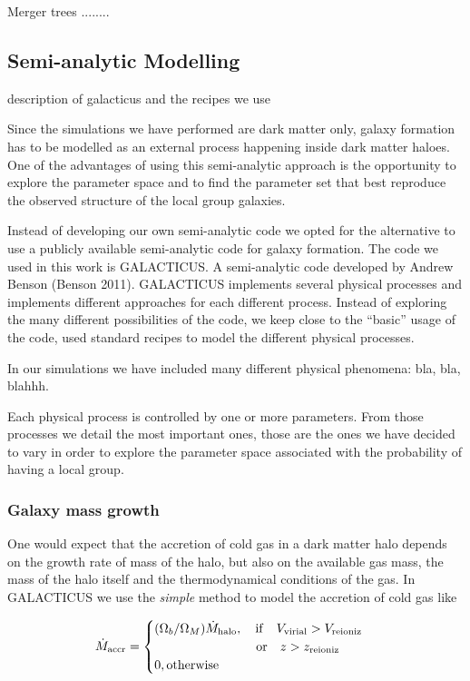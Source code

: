 \documentclass[useAMS,usenatbib]{mn2e}
\begin{document}
Merger trees ........

\subsection{Semi-analytic Modelling} 
\label{sec:sam}

description of galacticus and the recipes we use

Since the simulations we have performed are dark matter only, galaxy
formation has to be modelled as an external process happening inside
dark matter haloes. One of the advantages of using this semi-analytic
approach is the opportunity to explore the parameter space and to find
the parameter set that best reproduce the observed structure of the
local group galaxies.

Instead of developing our own semi-analytic code we opted for the
alternative to use a publicly available semi-analytic code for galaxy
formation. The code we used in this work is GALACTICUS. A
semi-analytic code developed by Andrew Benson (Benson
2011). GALACTICUS implements several physical processes and implements
different approaches for each different process. Instead of exploring
the many different possibilities of the code, we keep close to the
``basic'' usage of the code, used standard recipes to model the
different physical processes.

In our simulations we have included many different physical phenomena:
bla, bla, blahhh.

Each physical process is controlled by one or more parameters. From
those processes we detail the most important ones, those are the ones we
have decided to vary in order to explore the parameter space
associated with the probability of having a local group.

\subsubsection{Galaxy mass growth}

One would expect that the accretion of cold gas in a dark matter halo
depends on the growth rate of mass of the halo, but also on the
available gas mass, the mass of the halo itself and the
thermodynamical conditions of the gas. In GALACTICUS we use the {\em
  simple} method to model the accretion of cold gas like

\begin{equation}
 \dot{M}_{{\rm accr}}=
 \begin{cases}
   (\Omega_b/\Omega_M)\dot{M}_{{\rm halo}},\quad {\rm if} \quad V_{{\rm virial}}>V_{{\rm reioniz}}\\
   \qquad \qquad \qquad \qquad {\rm or} \quad z>z_{{\rm reioniz}}\\
0, {\rm otherwise}
\end{cases}
\end{equation}
\end{document}

